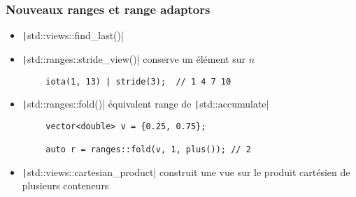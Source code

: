 \documentclass[C++.tex]{subfiles}
\begin{document}
\begin{frame}[fragile]
	\frametitle{Nouveaux ranges et range adaptors}
	\begin{itemize}
		\item \texttt|std::views::find_last()|
		\item \texttt|std::ranges::stride_view()| conserve un élément sur $n$
	\end{itemize}

	\begin{verbatim}
		iota(1, 13) | stride(3);  // 1 4 7 10
	\end{verbatim}

	\begin{itemize}
		\item \texttt|std::ranges::fold()| équivalent range de \texttt|std::accumulate|
	\end{itemize}

	\begin{verbatim}
		vector<double> v = {0.25, 0.75};

		auto r = ranges::fold(v, 1, plus()); // 2
	\end{verbatim}

	\begin{itemize}
		\item \texttt|std::views::cartesian_product| construit une vue sur le produit cartésien de plusieurs conteneurs
	\end{itemize}

\end{frame}
\end{document}
